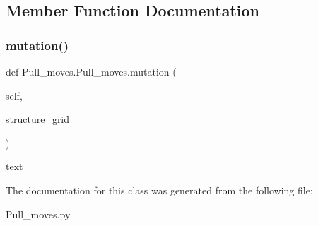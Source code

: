 \subsection{Member Function Documentation}
\mbox{\label{classPull__moves_1_1Pull__moves_a58ef6f3a1397cc435cd186513562f0a5}} 
\subsubsection{\texorpdfstring{mutation()}{mutation()}}
{\footnotesize\ttfamily def Pull\+\_\+moves.\+Pull\+\_\+moves.\+mutation (\begin{DoxyParamCaption}\item[{}]{self,  }\item[{}]{structure\+\_\+grid }\end{DoxyParamCaption})}

\begin{DoxyVerb}text
\end{DoxyVerb}
 

The documentation for this class was generated from the following file\+:\begin{DoxyCompactItemize}
\item 
Pull\+\_\+moves.\+py\end{DoxyCompactItemize}
